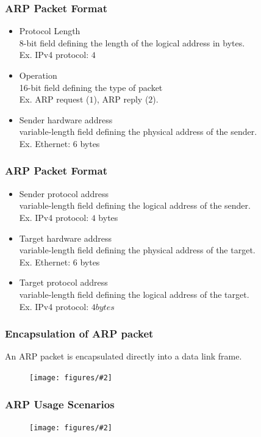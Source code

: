 \documentclass{beamer}
\newcommand{\fig}[2]{
\begin{center}
\begin{figure}
\texttt{[image: figures/\#2]}
\end{figure}
\end{center}
}
\begin{document}
\begin{frame}
\frametitle{\huge ARP Packet Format} 
\Large
 \begin{itemize} 
\item <1->  Protocol Length \\ $8$-bit field defining the length of the logical address in bytes. \\ 
\quad Ex. IPv4 protocol: $4$
\item <2-> Operation \\ 16-bit field defining the type of packet\\
\quad Ex. ARP request ($1$), ARP reply ($2$).
\item <3-> Sender hardware address \\  variable-length field defining the physical address of the sender. \\ 
\quad Ex. Ethernet: $6$ bytes 
\end{itemize}
\end{frame}


\begin{frame}
\frametitle{\huge ARP Packet Format} 
\Large
 \begin{itemize} 
\item <1->  Sender protocol address \\ variable-length field defining the logical address of the sender. \\ 
\quad Ex. IPv4 protocol: $4$ bytes
\item <2-> Target hardware address \\ variable-length field defining the physical address of the target.\\
\quad Ex. Ethernet: $6$ bytes 
\item <3-> Target protocol address \\ variable-length field defining the logical address of the target. \\ 
\quad Ex. IPv4 protocol: $4 bytes$
\end{itemize}
\end{frame}


\begin{frame}
\frametitle{\huge Encapsulation of ARP packet} 
\Large
An ARP packet is encapsulated directly into a data link frame.
\fig{0.5}{network_arpenc}
\end{frame}


\begin{frame}
\frametitle{\huge ARP Usage Scenarios} 
\fig{0.45}{network_arpscenario1}
\end{frame}
\end{document}
